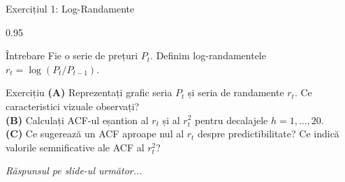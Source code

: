 \documentclass[9pt, aspectratio=169, t]{beamer}
\begin{document}
\begin{frame}{Exercițiul 1: Log-Randamente}
    \begin{cminipage}{0.95\textwidth}
    \begin{alertblock}{Întrebare}
        Fie o serie de prețuri $P_t$. Definim log-randamentele $r_t = \log(P_t / P_{t-1})$.
    \end{alertblock}

    \vspace{0.3cm}

    \begin{block}{Exercițiu}
        \textcolor{MainBlue}{\textbf{(A)}} Reprezentați grafic seria $P_t$ și seria de randamente $r_t$. Ce caracteristici vizuale observați?\\[3pt]
        \textcolor{MainBlue}{\textbf{(B)}} Calculați ACF-ul eșantion al $r_t$ și al $r_t^2$ pentru decalajele $h = 1, \ldots, 20$.\\[3pt]
        \textcolor{MainBlue}{\textbf{(C)}} Ce sugerează un ACF aproape nul al $r_t$ despre predictibilitate? Ce indică valorile semnificative ale ACF al $r_t^2$?
    \end{block}

    \vspace{0.3cm}

    \begin{center}
        \textit{Răspunsul pe slide-ul următor...}
    \end{center}
    \end{cminipage}
\end{frame}
\end{document}
